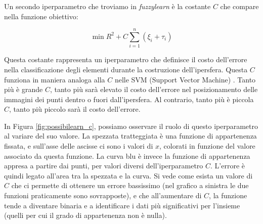 \documentclass[12pt,italian]{report}
\begin{document}
Un secondo iperparametro che troviamo in \emph{fuzzylearn} è la costante $C$ che compare nella funzione obiettivo:

\[ \min R^2 + C\sum_{i=1}^{n} (\xi_{i} + \tau_{i}) \]

Questa costante rappresenta un iperparametro che definisce il costo dell'errore nella classificazione degli elementi durante la costruzione dell'ipersfera. Questa $ C$ funziona in maniera analoga alla $C$ nelle SVM (Support Vector Machine) \cite{ben_hur}. Tanto più è grande $C$, tanto più sarà elevato il costo dell'errore nel posizionamento delle immagini dei punti dentro o fuori dall'ipersfera. Al contrario, tanto più è piccola $C$, tanto più piccolo sarà il costo dell'errore. 

In Figura \ref{fig:possibilearn_c}, possiamo osservare il ruolo di questo iperparametro al variare del suo valore. La spezzata tratteggiata è una funzione di appartenenza fissata, e sull'asse delle ascisse ci sono i valori di $ x $, colorati in funzione del valore associato da questa funzione. La curva blu è invece la funzione di appartenenza appresa a partire dai punti, per valori diversi dell'iperparametro $ C $. L'errore è quindi legato all'area tra la spezzata e la curva. Si vede come esista un valore di $ C $ che ci permette di ottenere un errore bassissimo (nel grafico a sinistra le due funzioni praticamente sono sovrapposte), e che all'aumentare di $ C $, la funzione tende a diventare binaria e a identificare i dati più significativi per l'insieme (quelli per cui il grado di appartenenza non è nulla). 
\end{document}
